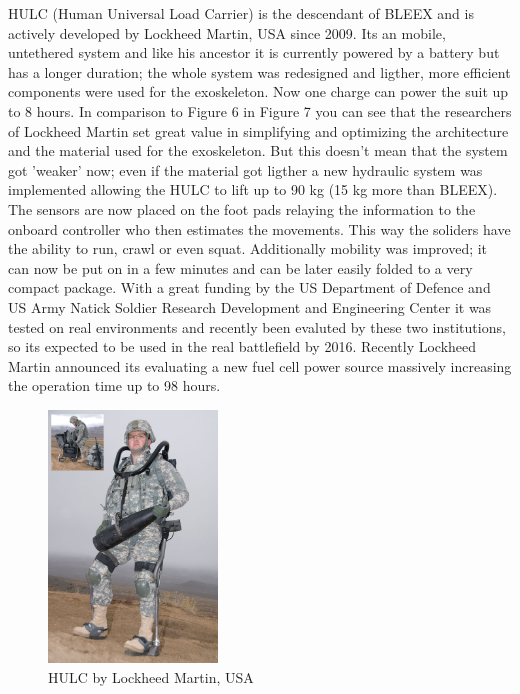 \documentclass[letterpaper, 10 pt, conference]{ieeeconf}  %
\begin{document}
HULC (Human Universal Load Carrier) is the descendant of BLEEX and is actively developed by Lockheed Martin, USA since 2009. Its an mobile, untethered system and like his ancestor it is currently powered by a battery but has a longer duration; the whole system was redesigned and ligther, more efficient components were used for the exoskeleton. Now one charge can power the suit up to 8 hours. In comparison to Figure 6 in Figure 7 you can see that the researchers of Lockheed Martin set great value in simplifying and optimizing the architecture and the material used for the exoskeleton. But this doesn't mean that the system got 'weaker' now; even if the material got ligther a new hydraulic system was implemented allowing the HULC to lift up to 90 kg (15 kg more than BLEEX). The sensors are now placed on the foot pads relaying the information to the onboard controller who then estimates the movements. This way the soliders have the ability to run, crawl or even squat. Additionally mobility was improved; it can now be put on in a few minutes and can be later easily folded to a very compact package. With a great funding by the US Department of Defence and US Army Natick Soldier Research Development and Engineering Center it was tested on real environments and recently been evaluted by these two institutions, so its expected to be used in the real battlefield by 2016. Recently Lockheed Martin announced its evaluating a new fuel cell power source massively increasing the operation time up to 98 hours.\newpage


\begin{figure}[H]
  \centering
    \includegraphics[width=0.4\textwidth]{img/hulc}
  \caption{HULC by Lockheed Martin, USA}
\end{figure}
\end{document}
